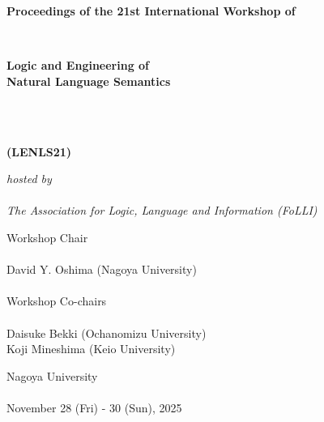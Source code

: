 \documentclass[12pt]{ltjarticle}
\begin{document}
\pagestyle{empty}

\vspace*{1cm}

\begin{center}

\begin{Large}
{\bf Proceedings of the 21st International Workshop of}
\end{Large} 
\\
\begin{huge}
{\bf Logic and Engineering of \\
Natural Language Semantics} 
\end{huge}
\\\ \\
\begin{huge}
{\bf (LENLS21)}
\end{huge}

\vspace*{1cm}

\begin{Large}
{\em hosted by \\\ \\ The Association for Logic, Language and Information (FoLLI)}
\end{Large}

\begin{large}
\vspace*{1cm}
Workshop Chair\\ $\;$\\
David Y. Oshima (Nagoya University) \\
\ \\
Workshop Co-chairs\\ $\;$\\
Daisuke Bekki (Ochanomizu University) \\
Koji Mineshima (Keio University) \\

\end{large}

\vspace*{3cm}


\vspace*{1cm}

\begin{large}
Nagoya University \\
 \\
November 28 (Fri) - 30 (Sun), 2025
\end{large}
\vfill

\end{center}
\end{document}
